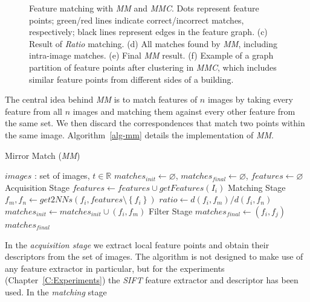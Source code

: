 \begin{figure}[h]
\begin{subfigure}[t]{0.5\columnwidth}
            \label{fig:pitts_partition}
        \end{subfigure}%
    \caption{Feature matching with \emph{MM} and \emph{MMC}. Dots 
        represent feature points; green/red lines indicate 
        correct/incorrect matches, respectively; black lines represent 
        edges in the feature graph.  (c) Result of \emph{Ratio} 
        matching.  (d) All matches found by \emph{MM}, including 
        intra-image matches.  (e) Final \emph{MM} result.  (f) Example 
    of a graph partition of feature points after clustering in 
\emph{MMC}, which includes similar feature points from different sides 
of a building.}%
    \label{fig:comparemirror}%
\end{figure}%
%
The central idea behind \emph{MM} is to match features of $n$ images by 
taking every feature from all $n$ images and matching them against every 
other feature from the same set. We then discard the correspondences 
that match two points within the same image. Algorithm~\ref{alg-mm} 
details the implementation of \emph{MM}.
%
\begin{algorithm}[htb]
\caption{Mirror Match (\emph{MM})}
\label{alg-mm}
{\fontsize{11}{11}\selectfont
\begin{algorithmic}
\Require $images$ : set of images, $t \in \mathbb{R}$
\State $matches_{init}\gets \varnothing$, $matches_{final}\gets 
\varnothing$, $features\gets \varnothing$
 \Comment Acquisition Stage
	\State $features\gets features \cup getFeatures(I_i)$
\EndFor
{} \Comment Matching Stage
	\State $f_m,f_n \gets get2NNs(f_i, features \setminus 
	\left\{f_i\right\})$
    \State $ratio \gets d(f_i, f_m) / d(f_i, f_n)$
		\State $matches_{init} \gets matches_{init} \cup \left(f_i, f_m\right)$
	\EndIf
\EndFor
{} \Comment Filter 
Stage
		\State $matches_{final} \gets (f_i, f_j)$
	\EndIf
\EndFor \\
\Return $matches_{final}$
\end{algorithmic}
}
\end{algorithm}
%
In the \emph{acquisition stage} we extract local feature points and 
obtain their descriptors from the set of images. The algorithm is not 
designed to make use of any feature extractor in particular, but for the
experiments (Chapter~\ref{C:Experiments}) the \emph{SIFT} feature 
extractor and descriptor has been used. In the \emph{matching} stage 
